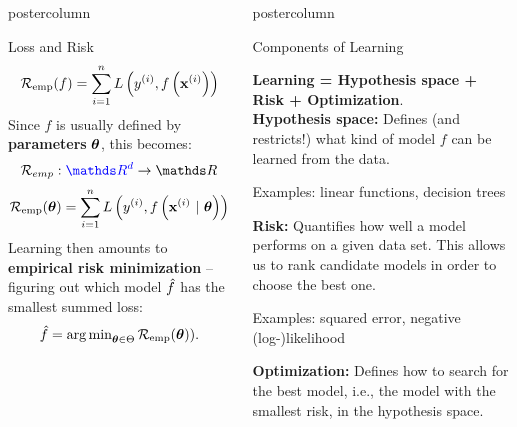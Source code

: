 \documentclass{beamer}
\newlength{\columnheight} %
\begin{document}
\begin{frame}[fragile]{}
\begin{columns}
\begin{column}{.31\textwidth}
\begin{beamercolorbox}[center]{postercolumn}
\begin{minipage}{.98\textwidth}
{\begin{myblock}{Loss and Risk}
  $$\mathcal{R}_{\text{emp}}(f) = \sum\limits_{i=1}^n L\left(y^{(i)}, f\left(\mathbf{x}^{(i)}\right)\right)$$ 
Since $f$ is usually defined by \textbf{parameters} $\bm{\theta}$, this becomes:
  $$\risk_{emp} : \textcolor{blue}{\R^d} \to \R$$
  $$\mathcal{R}_{\text{emp}}(\bm{\theta})  =  \sum\limits_{i=1}^n L\left(y^{(i)}, f\left(\mathbf{x}^{(i)} ~|~ \bm{\theta}\right)\right) $$
  Learning then amounts to \textbf{empirical risk minimization} -- figuring out which model $\hat{f}$ has the smallest summed loss:$$\hat{f} = \operatorname{arg\,min}_{\bm{\theta} \in \Theta} \mathcal{R}_{\text{emp}}(\bm{\theta})).$$
\end{myblock}
				}
			\end{minipage}
		\end{beamercolorbox}
	\end{column}
	\begin{column}{.31\textwidth}
		\begin{beamercolorbox}[center]{postercolumn}
			\begin{minipage}{.98\textwidth}
				\parbox[t][\columnheight]{\textwidth}{
          \begin{myblock}{Components of Learning}
  
            \textbf{Learning = Hypothesis space + Risk  + Optimization}. \\
        
            \textbf{Hypothesis space: } Defines (and restricts!) what kind of model $f$
        can be learned from the data.
            
            \hspace*{1ex} Examples: linear functions, decision trees
          
          \vspace*{0.5ex}
          
          \textbf{Risk: } Quantifies how well a model performs on a given
        data set. This allows us to rank candidate models in order to choose the best one.
        
          \hspace*{1ex} Examples: squared error, negative (log-)likelihood
          
          \vspace*{0.5ex}
          
          \textbf{Optimization: } Defines how to search for the best model, i.e., the model with the smallest {risk}, in the hypothesis space.
          

\end{myblock}}
\end{minipage}
\end{beamercolorbox}
\end{column}
\end{columns}
\end{frame}
\end{document}
